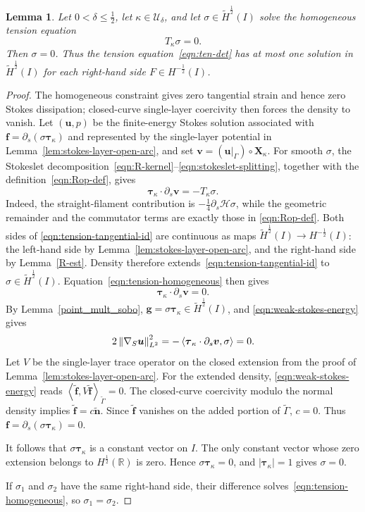 \documentclass[11pt,reqno]{amsart}
\theoremstyle{plain}
\newtheorem{lemma}[theorem]{Lemma}
\theoremstyle{definition}
\numberwithin{equation}{section}
\newcommand{\p}{\partial}
\newcommand{\grad}[1]{\nabla #1}
\newcommand{\mc}[1]{\mathcal{#1}}
\newcommand{\wt}[1]{\widetilde{#1}}
\newcommand{\bm}[1]{\boldsymbol{#1}}
\newcommand{\abs}[1]{\left\lvert #1 \right\rvert}
\newcommand{\norm}[1]{\left\lVert #1 \right\rVert}
\newcommand{\dual}[2]{\left\langle #1,#2 \right\rangle}
\newcommand{\R}{\mathbb{R}}
\newcommand{\tk}{\bm\tau_\kappa}
\newcommand{\xk}{\bm X_\kappa}
\newcommand{\hi}[1]{H^{#1}(I)}
\newcommand{\thi}[1]{\wt H^{#1}(I)}
\begin{document}
\begin{lemma}\label{ten-unique}
Let $0<\delta\le\frac12$, let
$\kappa\in\mc U_\delta$, and let
$\sigma\in\thi{\frac{1}{2}}$ solve the homogeneous tension equation
\begin{equation}\label{eqn:tension-homogeneous}
    T_\kappa\sigma=0.
\end{equation}
Then $\sigma=0$. Thus the tension equation~\eqref{eqn:ten-det} has at
most one solution in $\thi{\frac{1}{2}}$ for each right-hand side
$F\in H^{-\frac{1}{2}}(I)$.
\end{lemma}
\begin{proof}
The homogeneous constraint gives zero tangential strain and hence zero
Stokes dissipation; closed-curve single-layer coercivity then forces the
density to vanish.
Let $(\bm u,p)$ be the finite-energy Stokes solution associated with
$\bm f=\p_s(\sigma\tk)$ and represented by the single-layer potential in
Lemma~\ref{lem:stokes-layer-open-arc}, and set
$\bm v=(\bm u|_\Gamma)\circ\xk$. For smooth $\sigma$, the Stokeslet
decomposition~\eqref{eqn:R-kernel}--\eqref{eqn:stokeslet-splitting},
together with the definition~\eqref{eqn:Rop-def}, gives
\begin{equation}\label{eqn:tension-tangential-id}
    \tk\cdot\p_s\bm v
    =
    -T_\kappa\sigma.
\end{equation}
Indeed, the straight-filament contribution is
$-\frac{1}{4}\p_s\mc H\sigma$, while the geometric remainder and the
commutator terms are exactly those in \eqref{eqn:Rop-def}.
Both sides of
\eqref{eqn:tension-tangential-id} are continuous as maps
$\thi{\frac{1}{2}}\to\hi{-\frac{1}{2}}$: the left-hand side by
Lemma~\ref{lem:stokes-layer-open-arc}, and the right-hand side by
Lemma~\ref{R-est}. Density therefore extends~\eqref{eqn:tension-tangential-id} to
$\sigma\in\thi{\frac{1}{2}}$. Equation~\eqref{eqn:tension-homogeneous} then gives
\begin{equation}
    \tk\cdot\p_s\bm v=0.
\end{equation}
By Lemma~\ref{point_mult_sobo},
$\bm g=\sigma\tk\in\wt H^{\frac12}(I)$, and
\eqref{eqn:weak-stokes-energy} gives
\begin{equation*}
    2\norm{\grad_S\bm u}_{L^2}^2
    =-\dual{\tk\cdot\p_s\bm v}{\sigma}=0.
\end{equation*}
Let $V$ be the single-layer trace operator on the closed extension
from the proof of Lemma~\ref{lem:stokes-layer-open-arc}. For the extended
density, \eqref{eqn:weak-stokes-energy} reads
$\dual{\wt{\bm f}}{V\wt{\bm f}}_{\wt\Gamma}=0$.
The closed-curve coercivity modulo the normal density
\cite[Proposition~7.4]{SayasSelgas2014} implies
$\wt{\bm f}=c\wt{\bm n}$. Since $\wt{\bm f}$ vanishes on the added
portion of $\wt\Gamma$, $c=0$. Thus $\bm f=\p_s(\sigma\tk)=0$.

It follows that $\sigma\tk$ is a constant vector on $I$. The only constant
vector whose zero extension belongs to $H^{\frac12}(\R)$ is zero. Hence
$\sigma\tk=0$, and $\abs{\tk}=1$ gives $\sigma=0$.

If $\sigma_1$ and $\sigma_2$ have the same right-hand side, their difference
solves~\eqref{eqn:tension-homogeneous}, so $\sigma_1=\sigma_2$.
\end{proof}
 
\end{document}

